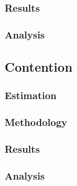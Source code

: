 \subsubsection{Results}

\subsubsection{Analysis}

\subsection{Contention}

\subsubsection{Estimation}

\subsubsection{Methodology}

\subsubsection{Results}

\subsubsection{Analysis}
